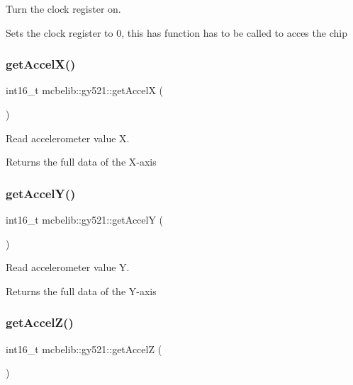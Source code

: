 Turn the clock register on. 

Sets the clock register to 0, this has function has to be called to acces the chip \mbox{\label{classmcbelib_1_1gy521_a65218b1467163b223d091ab309133b8c}} 
\subsubsection{\texorpdfstring{get\+Accel\+X()}{getAccelX()}}
{\footnotesize\ttfamily int16\+\_\+t mcbelib\+::gy521\+::get\+AccelX (\begin{DoxyParamCaption}{ }\end{DoxyParamCaption})}



Read accelerometer value X. 

Returns the full data of the X-\/axis \mbox{\label{classmcbelib_1_1gy521_a57711c636f4541aa442cac6fd9539666}} 
\subsubsection{\texorpdfstring{get\+Accel\+Y()}{getAccelY()}}
{\footnotesize\ttfamily int16\+\_\+t mcbelib\+::gy521\+::get\+AccelY (\begin{DoxyParamCaption}{ }\end{DoxyParamCaption})}



Read accelerometer value Y. 

Returns the full data of the Y-\/axis \mbox{\label{classmcbelib_1_1gy521_ad4b00d9882416e17a518b121c3f46b11}} 
\subsubsection{\texorpdfstring{get\+Accel\+Z()}{getAccelZ()}}
{\footnotesize\ttfamily int16\+\_\+t mcbelib\+::gy521\+::get\+AccelZ (\begin{DoxyParamCaption}{ }\end{DoxyParamCaption})}



